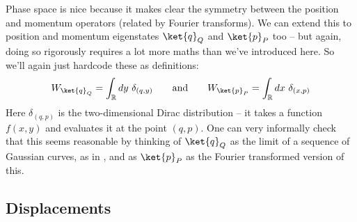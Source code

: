 Phase space is nice because it makes clear the symmetry between the position and momentum operators (related by Fourier transforms).
We can extend this to position and momentum eigenstates $\ket{q}_Q$ and $\ket{p}_P$ too -- but again, doing so rigorously requires a lot more maths than we've introduced here.
So we'll again just hardcode these as definitions:
\begin{equation}
    W_{\ket{q}_Q} = \int_{\mathbb{R}} dy\ \delta_{(q, y)}
    \qquad \text{and} \qquad
    W_{\ket{p}_P} = \int_{\mathbb{R}} dx\ \delta_{(x, p)}
\end{equation}
Here $\delta_{(q, p)}$ is the two-dimensional Dirac distribution -- it takes a function $f(x, y)$ and evaluates it at the point $(q, p)$.
One can very informally check that this seems reasonable by thinking of $\ket{q}_Q$ as the limit of a sequence of Gaussian curves, as in , and as $\ket{p}_P$ as the Fourier transformed version of this.

\subsection{Displacements}

